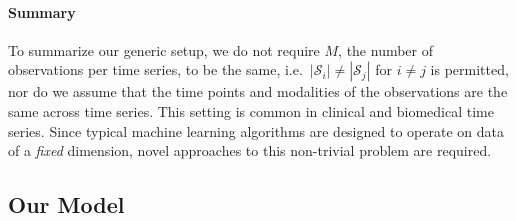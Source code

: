 \documentclass{article}
\begin{document}
\paragraph{Summary} To summarize our generic setup, we do not require
$M$, the number of observations per time series, to be the same, i.e.\
$|\mathcal{S}_i| \neq |\mathcal{S}_{j}|$ for $i \neq j$ is
permitted, nor do we assume that the time points and modalities of the
observations are the same across time series.
This setting is common in clinical and biomedical time series. Since
typical machine learning algorithms are designed to operate on data of
a \emph{fixed} dimension, novel approaches to this non-trivial problem
are required.

\subsection{Our Model}
\end{document}
